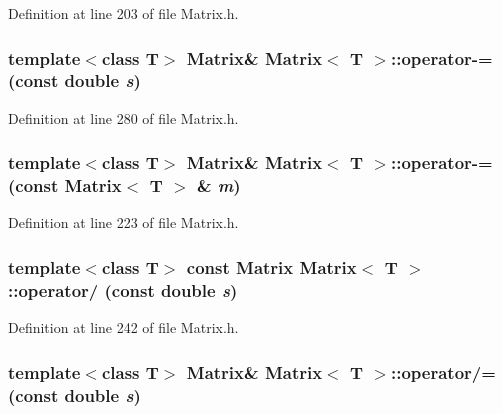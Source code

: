 Definition at line 203 of file Matrix.h.

\hypertarget{classMatrix_ad513d4073587eab0cee247875b6c860a}{
\subsubsection[{operator-\/=}]{\setlength{\rightskip}{0pt plus 5cm}template$<$class T$>$ {\bf Matrix}\& {\bf Matrix}$<$ T $>$::operator-\/= (const double {\em s})}}
\label{classMatrix_ad513d4073587eab0cee247875b6c860a}


Definition at line 280 of file Matrix.h.

\hypertarget{classMatrix_a0e459fd035b2435ea016dc93c55ccac0}{
\subsubsection[{operator-\/=}]{\setlength{\rightskip}{0pt plus 5cm}template$<$class T$>$ {\bf Matrix}\& {\bf Matrix}$<$ T $>$::operator-\/= (const {\bf Matrix}$<$ T $>$ \& {\em m})}}
\label{classMatrix_a0e459fd035b2435ea016dc93c55ccac0}


Definition at line 223 of file Matrix.h.

\hypertarget{classMatrix_a2525c0e0feb231dd01fb6ae96aa53dac}{
\subsubsection[{operator/}]{\setlength{\rightskip}{0pt plus 5cm}template$<$class T$>$ const {\bf Matrix} {\bf Matrix}$<$ T $>$::operator/ (const double {\em s})}}
\label{classMatrix_a2525c0e0feb231dd01fb6ae96aa53dac}


Definition at line 242 of file Matrix.h.

\hypertarget{classMatrix_ad1acebe419756785acef046796fb6060}{
\subsubsection[{operator/=}]{\setlength{\rightskip}{0pt plus 5cm}template$<$class T$>$ {\bf Matrix}\& {\bf Matrix}$<$ T $>$::operator/= (const double {\em s})}}
\label{classMatrix_ad1acebe419756785acef046796fb6060}



